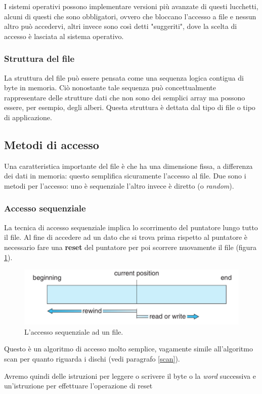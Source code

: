 I sistemi operativi possono implementare versioni più avanzate di questi lucchetti, alcuni di questi che sono obbligatori, ovvero che bloccano l'accesso a file e nessun altro può accedervi, altri invece sono così detti "suggeriti", dove la scelta di accesso è lasciata al sistema operativo.

% 
\subsubsection{Struttura del file}
La struttura del file può essere pensata come una sequenza logica contigua di byte in memoria. Ciò nonostante tale sequenza può concettualmente rappresentare delle strutture dati che non sono dei semplici array ma possono essere, per esempio, degli alberi. Questa struttura è dettata dal tipo di file o tipo di applicazione.

%
\subsection{Metodi di accesso}
Una caratteristica importante del file è che ha una dimensione fissa, a differenza dei dati in memoria: questo semplifica sicuramente l'accesso al file. Due sono i metodi per l'accesso: uno è sequenziale l'altro invece è diretto (o \textit{random}).

\subsubsection{Accesso sequenziale}
La tecnica di accesso sequenziale implica lo scorrimento del puntatore lungo tutto il file. Al fine di accedere ad un dato che si trova prima rispetto al puntatore è necessario fare una \textbf{reset} del puntatore per poi scorrere nuovamente il file (figura \ref{fig:accesso sequenziale}).
\begin{figure}[h]
    \centering
    \includegraphics[width = .5\textwidth]{../res/imgs/file system interface/accesso sequenziale.png}
    \caption{L'accesso sequenziale ad un file.}
    \label{fig:accesso sequenziale}
\end{figure}
Questo è un algoritmo di accesso molto semplice, vagamente simile all'algoritmo scan per quanto riguarda i dischi (vedi paragrafo \ref{scan}).

Avremo quindi delle istruzioni per leggere o scrivere il byte o la \textit{word} successiva e un'istruzione per effettuare l'operazione di reset

